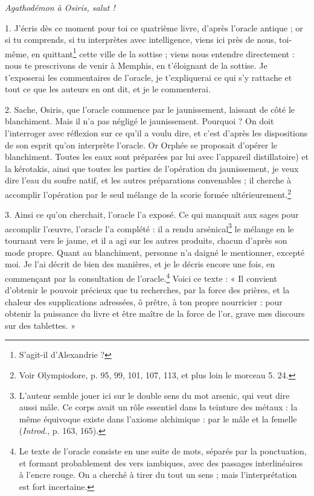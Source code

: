 \documentclass[a4paper, 11pt, oneside, polutonikogreek, french]{article}
\begin{document}
\emph{Agathodémon à Osiris, salut !}

1. J'écris dès ce moment pour toi ce quatrième livre, d'après l'oracle antique ; or si tu comprends, si tu interprètes avec intelligence, viens ici près de nous, toi-même, en quittant\footnote{S'agit-il d'Alexandrie ?} cette ville de la sottise ; viens nous entendre directement : nous te prescrivons de venir à Memphis, en t'éloignant de la sottise. Je t'exposerai les commentaires de l'oracle, je t'expliquerai ce qui s'y rattache et tout ce que les auteurs en ont dit, et je le commenterai.

2. Sache, Osiris, que l'oracle commence par le jaunissement, laissant de côté le blanchiment. Mais il n'a pas négligé le jaunissement. Pourquoi ? On doit l'interroger avec réflexion sur ce qu'il a voulu dire, et c'est d'après les dispositions de son esprit qu'on interprète l'oracle. Or Orphée se proposait d'opérer le blanchiment. Toutes les eaux sont préparées par lui avec l'appareil distillatoire) et la kérotakis, ainsi que toutes les parties de l'opération du jaunissement, je veux dire l'eau du soufre natif, et les autres préparations convenables ; il cherche à accomplir l'opération par le seul mélange de la scorie formée ultérieurement.\footnote{Voir Olympiodore, p. 95, 99, 101, 107, 113, et plus loin le morceau 5. 24.}

3. Ainsi ce qu'on cherchait, l'oracle l'a exposé. Ce qui manquait aux sages pour accomplir l'œuvre, l'oracle l'a complété : il a rendu arsénical\footnote{L'auteur semble jouer ici sur le double sens du mot arsenic, qui veut dire aussi mâle. Ce corps avait un rôle essentiel dans la teinture des métaux : la même équivoque existe dans l'axiome alchimique : par le mâle et la femelle (\emph{Introd.}, p. 163, 165).} le mélange en le tournant vers le jaune, et il a agi sur les autres produits, chacun d'après son mode propre. Quant au blanchiment, personne n'a daigné le mentionner, excepté moi. Je l'ai décrit de bien des manières, et je le décris encore une fois, en commençant par la consultation de l'oracle.\footnote{Le texte de l'oracle consiste en une suite de mots, séparés par la ponctuation, et formant probablement des vers iambiques, avec des passages interlinéaires à l'encre rouge. On a cherché à tirer du tout un sens ; mais l'interprétation est fort incertaine.} Voici ce texte : « Il convient d'obtenir le pouvoir précieux que tu recherches, par la force des prières, et la chaleur des supplications adressées, ô prêtre, à ton propre nourricier : pour obtenir la puissance du livre et être maître de la force de l'or, grave mes discours sur des tablettes. »
\end{document}
